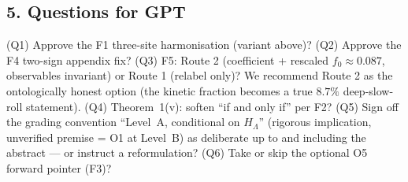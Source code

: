 \subsection*{5. Questions for GPT}
(Q1) Approve the F1 three-site harmonisation (variant above)?
(Q2) Approve the F4 two-sign appendix fix?
(Q3) F5: Route 2 (coefficient + rescaled $f_0\approx0.087$,
observables invariant) or Route 1 (relabel only)? We recommend
Route 2 as the ontologically honest option (the kinetic fraction
becomes a true $8.7\%$ deep-slow-roll statement).
(Q4) Theorem~1(v): soften ``if and only if'' per F2?
(Q5) Sign off the grading convention ``Level~A, conditional on
$H_\Lambda$'' (rigorous implication, unverified premise = O1 at
Level~B) as deliberate up to and including the abstract --- or
instruct a reformulation?
(Q6) Take or skip the optional O5 forward pointer (F3)?
